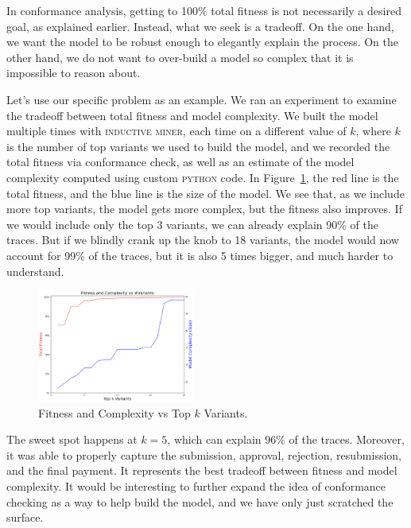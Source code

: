 \documentclass[conference]{IEEEtran}
\begin{document}
In conformance analysis,
getting to 100\% total fitness is not necessarily
a desired goal, as explained earlier.
Instead, what we seek is a tradeoff. On the one hand, we want the model
to be robust enough to elegantly explain the process. On the other hand,
we do not want to over-build a model so complex that it is impossible to
reason about.

Let's use our specific problem as an example. We
ran an experiment to examine the tradeoff between total fitness and model
complexity. We built the model multiple times with \textsc{inductive miner},
each time on a different value of $k$, where $k$ is the number of top
variants we
used to build the model, and we recorded the total fitness via conformance
check, as well as an estimate of the model complexity computed using
custom \textsc{python} code.
In Figure~\ref{fig-tradeoff}, the
red line is the total fitness, and the blue line is the size of the
model. We see that, as we include more top variants, the model gets more
complex, but the fitness also improves. If we would include only the top
3 variants, we can already explain 90\% of the traces. But if we blindly
crank up the knob to 
18 variants, the model would now account for 99\% of the traces, but
it is also 5 times bigger, and much harder to understand.

\begin{figure}[htbp]
\centerline{\includegraphics[width=0.46\textwidth]{images/tradeoff.png}}
\caption{Fitness and Complexity vs Top $k$ Variants.}
\label{fig-tradeoff}
\end{figure}

The sweet spot happens at $k = 5$, which can explain 96\% of the traces.
Moreover,
it was able to properly capture the submission, approval, rejection,
resubmission, and the final payment. It represents the best tradeoff
between fitness and model complexity. It would be interesting to further
expand the idea of conformance checking as a way to help build the model,
and we have only just scratched the surface.


\end{document}

